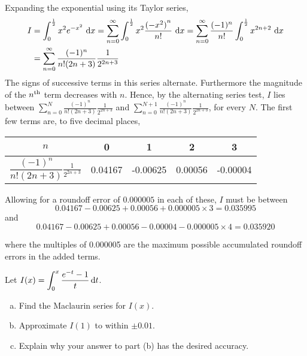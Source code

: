\begin{solution}
Expanding the exponential using its Taylor series,
\begin{align*}
I&=\int_0^{\frac{1}{2}} x^2 e^{-x^2}\ \dee{x}
=\sum_{n=0}^\infty\int_0^{\frac{1}{2}} x^2 \frac{{(-x^2)}^n}{n!}\ \dee{x}
=\sum_{n=0}^\infty \frac{(-1)^n}{n!}\int_0^{\frac{1}{2}} x^{2n+2} \ \dee{x} \\
&=\sum_{n=0}^\infty \frac{(-1)^n}{n!(2n+3)}\frac{1}{2^{2n+3}}
\end{align*}
The signs of successive terms in this series alternate. Furthermore the
magnitude of the $n^{\rm th}$ term decreases with $n$. Hence, by the alternating
series test, $I$ lies between
$\sum\limits_{n=0}^N \frac{(-1)^n}{n!(2n+3)}\frac{1}{2^{2n+3}}$ and
$\sum\limits_{n=0}^{N+1} \frac{(-1)^n}{n!(2n+3)}\frac{1}{2^{2n+3}}$, for every
$N$. The first few terms are, to five decimal places,
\renewcommand{\arraystretch}{1.5}
\begin{center}
     \begin{tabular}{|c|c|c|c|c|}
          \hline
          $n$&0&1&2&3  \\
          \hline
          $\dfrac{(-1)^n}{n!(2n+3)}\frac{1}{2^{2n+3}}$&0.04167&-0.00625&0.00056&-0.00004\\
          \hline
     \end{tabular}
\end{center}
\renewcommand{\arraystretch}{1.0}
Allowing for a roundoff error of $0.000005$ in each of these,
$I$ must be between
\begin{equation*}
0.04167-0.00625+0.00056+0.000005\times 3=0.035995
\end{equation*}
and
\begin{equation*}
0.04167-0.00625+0.00056-0.00004-0.000005\times 4=0.035920
\end{equation*}

where the multiples of
 0.000005 are the maximum
possible accumulated roundoff errors in the added terms.
\end{solution}


\begin{question}[1996D]
 Let $\displaystyle I(x)=\int_0^x\frac{e^{-t}-1}{t}\,\mathrm{d}t$.
\begin{enumerate}[(a)]
\item
Find the Maclaurin series for $I(x)$.
\item
 Approximate $I(1)$ to within $\pm0.01$.
\item
Explain why your answer to part (b) has the desired accuracy.
\end{enumerate}
\end{question}

